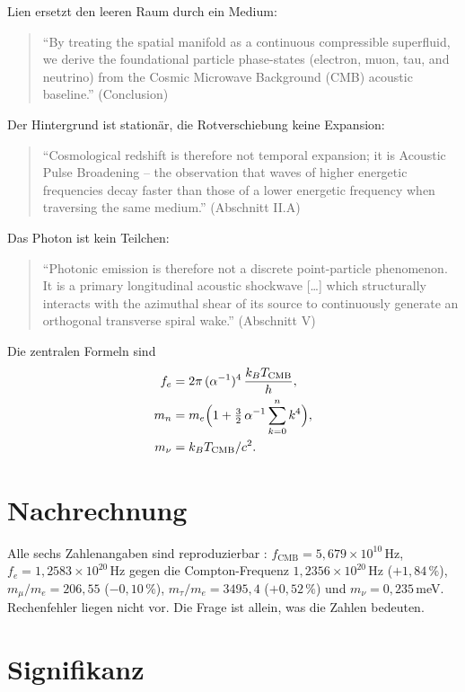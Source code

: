 Lien ersetzt den leeren Raum durch ein Medium:
\begin{quote}\QM
\enquote{By treating the spatial manifold as a continuous compressible
superfluid, we derive the foundational particle phase-states (electron, muon,
tau, and neutrino) from the Cosmic Microwave Background (CMB) acoustic
baseline.} (Conclusion)
\end{quote}
Der Hintergrund ist stationär, die Rotverschiebung keine Expansion:
\begin{quote}\QM
\enquote{Cosmological redshift is therefore not temporal expansion; it is
Acoustic Pulse Broadening -- the observation that waves of higher energetic
frequencies decay faster than those of a lower energetic frequency when
traversing the same medium.} (Abschnitt II.A)
\end{quote}
Das Photon ist kein Teilchen:
\begin{quote}\QM
\enquote{Photonic emission is therefore not a discrete point-particle
phenomenon. It is a primary longitudinal acoustic shockwave [\ldots] which
structurally interacts with the azimuthal shear of its source to continuously
generate an orthogonal transverse spiral wake.} (Abschnitt V)
\end{quote}
Die zentralen Formeln sind
\begin{align}
f_e &= 2\pi\,(\alpha^{-1})^4\,\frac{k_BT_\text{CMB}}{h}, \label{eq:lien-fe}\\
m_n &= m_e\Bigl(1+\tfrac{3}{2}\,\alpha^{-1}\sum_{k=0}^{n}k^4\Bigr), \label{eq:lien-mn}\\
m_\nu &= k_BT_\text{CMB}/c^2. \label{eq:lien-mnu}
\end{align}

\section{Nachrechnung}

Alle sechs Zahlenangaben sind reproduzierbar \KM:
$f_\text{CMB}=5{,}679\times10^{10}$\,Hz, $f_e=1{,}2583\times10^{20}$\,Hz
gegen die Compton-Frequenz $1{,}2356\times10^{20}$\,Hz ($+1{,}84\,\%$),
$m_\mu/m_e=206{,}55$ ($-0{,}10\,\%$), $m_\tau/m_e=3495{,}4$ ($+0{,}52\,\%$) und
$m_\nu=0{,}235$\,meV. Rechenfehler liegen nicht vor. Die Frage ist allein,
was die Zahlen bedeuten.

\section{Signifikanz}

